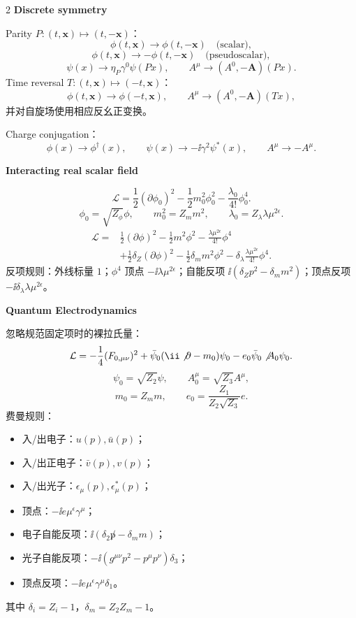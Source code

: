\begin{multicols}{2}
\textbf{Discrete symmetry}

Parity $P:(t,\mathbf x)\mapsto(t,-\mathbf x)$：
\[
\phi(t,\mathbf x)\to\phi(t,-\mathbf x)\quad\text{(scalar)},
\]
\[
\phi(t,\mathbf x)\to-\phi(t,-\mathbf x)\quad\text{(pseudoscalar)},
\]
\[
\psi(x)\to\eta_P\gamma^0\psi(Px),\qquad
A^\mu\to(A^0,-\mathbf A)(Px).
\]
Time reversal $T:(t,\mathbf x)\mapsto(-t,\mathbf x)$：
\[
\phi(t,\mathbf x)\to\phi(-t,\mathbf x),
\qquad
A^\mu\to(A^0,-\mathbf A)(Tx),
\]
并对自旋场使用相应反幺正变换。

Charge conjugation：
\[
\phi(x)\to\phi^\dagger(x),
\qquad
\psi(x)\to-\ii\gamma^2\psi^*(x),
\qquad
A^\mu\to-A^\mu.
\]

\textbf{Interacting real scalar field}

\[
\mathcal L=\frac12(\partial\phi_0)^2-\frac12m_0^2\phi_0^2-\frac{\lambda_0}{4!}\phi_0^4.
\]
\[
\phi_0=\sqrt{Z_\phi}\phi,
\qquad m_0^2=Z_m m^2,
\qquad \lambda_0=Z_\lambda\lambda\mu^{2\epsilon}.
\]
\[
\begin{aligned}
\mathcal L={}&\frac12(\partial\phi)^2-\frac12m^2\phi^2-\frac{\lambda\mu^{2\epsilon}}{4!}\phi^4\\
&+\frac12\delta_Z(\partial\phi)^2-\frac12\delta_m m^2\phi^2
-\delta_\lambda\frac{\lambda\mu^{2\epsilon}}{4!}\phi^4.
\end{aligned}
\]
反项规则：外线标量 $1$；$\phi^4$ 顶点 $-\ii\lambda\mu^{2\epsilon}$；自能反项 $\ii(\delta_Zp^2-\delta_m m^2)$；顶点反项 $-\ii\delta_\lambda\lambda\mu^{2\epsilon}$。

\columnbreak
\textbf{Quantum Electrodynamics}

忽略规范固定项时的裸拉氏量：
\[
\mathcal L=-\frac14(F_{0,\mu\nu})^2+\bar\psi_0(\ii\not\partial-m_0)\psi_0
-e_0\bar\psi_0\not A_0\psi_0.
\]
\[
\psi_0=\sqrt{Z_2}\psi,\qquad
A_0^\mu=\sqrt{Z_3}A^\mu,
\]
\[
m_0=Z_m m,\qquad
e_0=\frac{Z_1}{Z_2\sqrt{Z_3}}e.
\]
费曼规则：
\begin{itemize}
\item 入/出电子：$u(p),\bar u(p)$；
\item 入/出正电子：$\bar v(p),v(p)$；
\item 入/出光子：$\epsilon_\mu(p),\epsilon_\mu^*(p)$；
\item 顶点：$-\ii e\mu^\epsilon\gamma^\mu$；
\item 电子自能反项：$\ii(\delta_2\not p-\delta_m m)$；
\item 光子自能反项：$-\ii(g^{\mu\nu}p^2-p^\mu p^\nu)\delta_3$；
\item 顶点反项：$-\ii e\mu^\epsilon\gamma^\mu\delta_1$。
\end{itemize}
其中 $\delta_i=Z_i-1$，$\delta_m=Z_2Z_m-1$。


\end{multicols}
